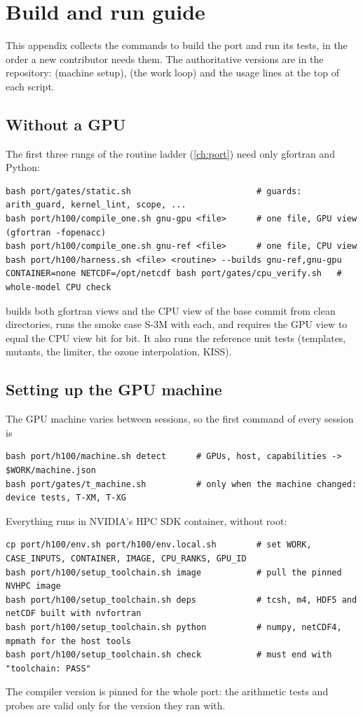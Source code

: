 \chapter{Build and run guide}\label{app:build}

This appendix collects the commands to build the port and run its tests, in the order a new contributor needs them.
The authoritative versions are in the repository:  (machine setup),
 (the work loop) and the usage lines at the top of each script.

\section{Without a GPU}

The first three rungs of the routine ladder (\cref{ch:port}) need only gfortran and Python:
\begin{lstlisting}[language={}]
bash port/gates/static.sh                         # guards: arith_guard, kernel_lint, scope, ...
bash port/h100/compile_one.sh gnu-gpu <file>      # one file, GPU view (gfortran -fopenacc)
bash port/h100/compile_one.sh gnu-ref <file>      # one file, CPU view
bash port/h100/harness.sh <file> <routine> --builds gnu-ref,gnu-gpu
CONTAINER=none NETCDF=/opt/netcdf bash port/gates/cpu_verify.sh   # whole-model CPU check
\end{lstlisting}
 builds both gfortran views and the CPU view of the base commit from clean directories, runs the
smoke case S-3M with each, and requires the GPU view to equal the CPU view bit for bit. It also runs the reference unit
tests (templates, mutants, the limiter, the ozone interpolation, KISS).

\section{Setting up the GPU machine}

The GPU machine varies between sessions, so the first command of every session is
\begin{lstlisting}[language={}]
bash port/h100/machine.sh detect      # GPUs, host, capabilities -> $WORK/machine.json
bash port/gates/t_machine.sh          # only when the machine changed: device tests, T-XM, T-XG
\end{lstlisting}

Everything runs in NVIDIA's HPC SDK container, without root:
\begin{lstlisting}[language={}]
cp port/h100/env.sh port/h100/env.local.sh        # set WORK, CASE_INPUTS, CONTAINER, IMAGE, CPU_RANKS, GPU_ID
bash port/h100/setup_toolchain.sh image           # pull the pinned NVHPC image
bash port/h100/setup_toolchain.sh deps            # tcsh, m4, HDF5 and netCDF built with nvfortran
bash port/h100/setup_toolchain.sh python          # numpy, netCDF4, mpmath for the host tools
bash port/h100/setup_toolchain.sh check           # must end with "toolchain: PASS"
\end{lstlisting}
The compiler version is pinned for the whole port: the arithmetic tests and probes are valid only for the version
they ran with.

